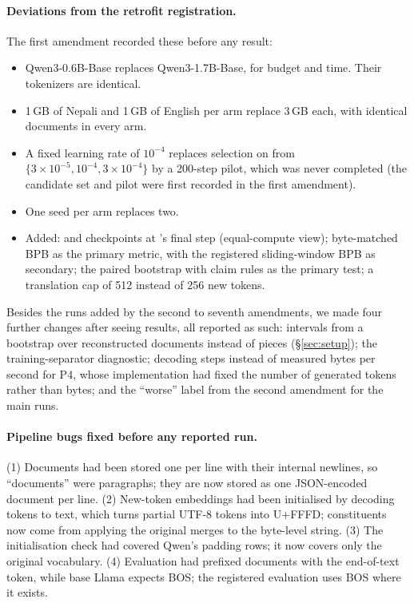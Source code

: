 \paragraph{Deviations from the retrofit registration.} The first amendment recorded these before any result:
\begin{itemize}
  \setlength\itemsep{0pt}
  \item Qwen3-0.6B-Base replaces Qwen3-1.7B-Base, for budget and time. Their tokenizers are identical.
  \item 1\,GB of Nepali and 1\,GB of English per arm replace 3\,GB each, with identical documents in every arm.
  \item A fixed learning rate of $10^{-4}$ replaces selection on \RO{} from $\{3{\times}10^{-5}, 10^{-4}, 3{\times}10^{-4}\}$ by a 200-step pilot, which was never completed (the candidate set and pilot were first recorded in the first amendment).
  \item One seed per arm replaces two.
  \item Added: \RO{} and \RI{} checkpoints at \RII{}'s final step (equal-compute view); byte-matched BPB as the primary metric, with the registered sliding-window BPB as secondary; the paired bootstrap with claim rules as the primary test; a translation cap of 512 instead of 256 new tokens.
\end{itemize}
Besides the runs added by the second to seventh amendments, we made four further changes after seeing results, all reported as such: intervals from a bootstrap over reconstructed documents instead of pieces (\S\ref{sec:setup}); the training-separator diagnostic; decoding steps instead of measured bytes per second for P4, whose implementation had fixed the number of generated tokens rather than bytes; and the ``worse'' label from the second amendment for the main runs.

\paragraph{Pipeline bugs fixed before any reported run.} (1) Documents had been stored one per line with their internal newlines, so ``documents'' were paragraphs; they are now stored as one JSON-encoded document per line. (2) New-token embeddings had been initialised by decoding tokens to text, which turns partial UTF-8 tokens into U+FFFD; constituents now come from applying the original merges to the byte-level string. (3) The initialisation check had covered Qwen's padding rows; it now covers only the original vocabulary. (4) Evaluation had prefixed documents with the end-of-text token, while base Llama expects BOS; the registered evaluation uses BOS where it exists.

